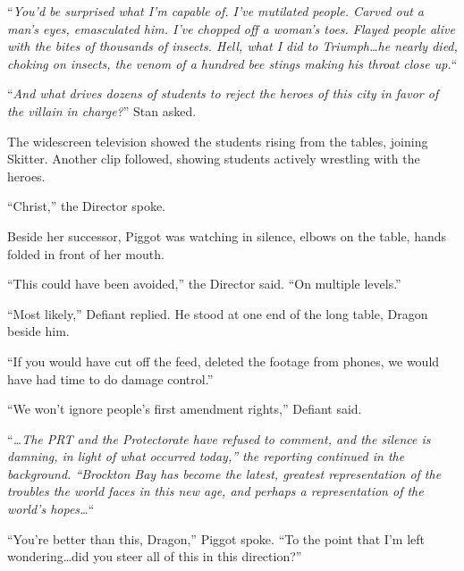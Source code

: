 \sectionbreak



``\emph{You'd be surprised what I'm capable of.  I've mutilated people.  Carved out a man's eyes, emasculated him.  I've chopped off a woman's toes.  Flayed people alive with the bites of thousands of insects.  Hell, what I did to Triumph\ldots he nearly died, choking on insects, the venom of a hundred bee stings making his throat close up.}``



``\emph{And what drives dozens of students to reject the heroes of this city in favor of the villain in charge?}''  Stan asked.



The widescreen television showed the students rising from the tables, joining Skitter.  Another clip followed, showing students actively wrestling with the heroes.



``Christ,'' the Director spoke.



Beside her successor, Piggot was watching in silence, elbows on the table, hands folded in front of her mouth.



``This could have been avoided,'' the Director said.  ``On multiple levels.''



``Most likely,'' Defiant replied.  He stood at one end of the long table, Dragon beside him.



``If you would have cut off the feed, deleted the footage from phones, we would have had time to do damage control.''



``We won't ignore people's first amendment rights,'' Defiant said.



``\emph{\ldots{}The PRT and the Protectorate have refused to comment, and the silence is damning, in light of what occurred today,'' the reporting continued in the background.  ``Brockton Bay has become the latest, greatest representation of the troubles the world faces in this new age, and perhaps a representation of the world's hopes\ldots}``



``You're better than this, Dragon,'' Piggot spoke.  ``To the point that I'm left wondering\ldots did you steer all of this in this direction?''



